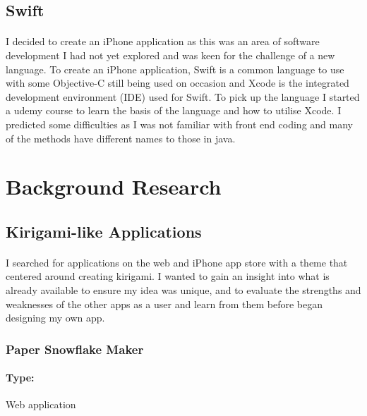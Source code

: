 \documentclass[11pt]{article}
\begin{document}
                  \subsection{Swift}
               
                \paragraph{} 
                    I decided to create an iPhone application as this was an area of software development I had not yet explored and was keen for the challenge of a new language. To create an iPhone application, Swift is a common language to use with some Objective-C still being used on occasion and Xcode is the integrated development environment (IDE) used for Swift. To pick up the language I started a udemy course %
                    to learn the basis of the language and how to utilise Xcode. I predicted some difficulties as I was not familiar with front end coding and many of the methods have different names to those in java. 

\newpage
\section{Background Research}

        \subsection{Kirigami-like Applications}
           \paragraph{}
            I searched for applications on the web and iPhone app store with a theme that centered around creating kirigami. I wanted to gain an insight into what is already available to ensure my idea was unique, and to evaluate the strengths and weaknesses of the other apps as a user and learn from them before began designing my own app.
        
            \subsubsection{Paper Snowflake Maker}
            
                \paragraph{Type:} Web application %
                
\end{document}
